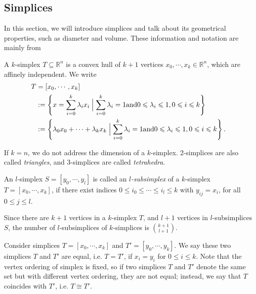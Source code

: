     \subsection{Simplices}
    In this section, we will introduce simplices and talk about its geometrical properties, such as diameter and volume. These information and notation are mainly from \cite{ciarlet2002finite}\cite{bey2000simplicial}
    \noindent
    \begin{definition*}
    A $k$-simplex $T \subseteq\mathbb{R}^n$ is a convex hull of $k+1$ vertices ${x}_0, \cdots, {x}_k \in \mathbb{R}^n$, which are affinely independent. We write 
    \begin{equation*}
    \begin{split}
    {T} & = [{x}_0, \cdots, {x}_k ]\\
    & := \left\{{x} = \sum\limits_{i=0}^k \lambda_i {x}_i \Bigm| \sum\limits_{i=0}^k \lambda_i = 1 \text{and} 0 \leqslant \lambda_i \leqslant 1, 0 \leqslant i \leqslant k \right\}\\
    & := \left\{\lambda_0{x}_0 + \cdots + \lambda_k{x}_k \Bigm| \sum\limits_{i=0}^k \lambda_i = 1 \text{and} 0 \leqslant \lambda_i \leqslant 1, 0 \leqslant i \leqslant k \right\}.
    \end{split}
    \end{equation*}
    \end{definition*}
    If $k = n$, we do not address the dimension of a $k$-simplex. 2-simplices are also called \emph{triangles}, and 3-simplices are called \emph{tetrahedra}.

    \begin{definition*}
    An  $l$-simplex ${S} = [{y}_0, \cdots, {y}_l]$ is called an \emph{$l$-subsimplex} of a $k$-simplex ${T} = [{x}_0, \cdots, {x}_k]$, if there exist indices $0 \leqslant {i}_0 \leqslant \cdots\leqslant{i}_l \leqslant k$ with ${y}_{ij} = {x}_i$, for all $0 \leqslant j \leqslant l$.
    \end{definition*}
    Since there are $k+1$ vertices in a $k$-simplex $T$, and $l+1$ vertices in $l$-subsimplices $S$, the number of $l$-subsimplices of $k$-simplices is $\binom{k+1}{l+1}$.


    Consider simplices $T = [{x}_0, \cdots, {x}_k]$ and $T' = [{y}_0, \cdots, {y}_k]$. We say these two simplices $T$ and $T'$ are equal, i.e. $T = T'$, if ${x}_i = {y}_i$ for $0 \leqslant i \leqslant k$. Note that the vertex ordering of simplex is fixed, so if two simplices $T$ and $T'$ denote the same set but with different vertex ordering, they are not equal; instead, we say that ${T}$ coincides with $T'$, i.e. $T \cong T'$.

